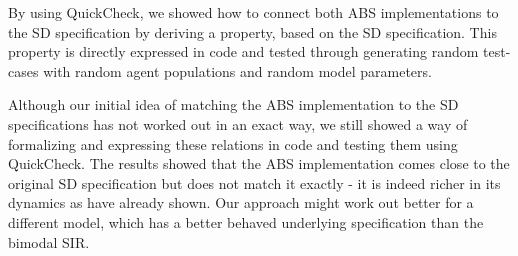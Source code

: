 By using QuickCheck, we showed how to connect both ABS implementations to the SD specification by deriving a property, based on the SD specification. This property is directly expressed in code and tested through generating random test-cases with random agent populations and random model parameters. 

Although our initial idea of matching the ABS implementation to the SD specifications has not worked out in an exact way, we still showed a way of formalizing and expressing these relations in code and testing them using QuickCheck. The results showed that the ABS implementation comes close to the original SD specification but does not match it exactly - it is indeed richer in its dynamics as \cite{macal_agent-based_2010, figueredo_comparing_2014} have already shown. Our approach might work out better for a different model, which has a better behaved underlying specification than the bimodal SIR.